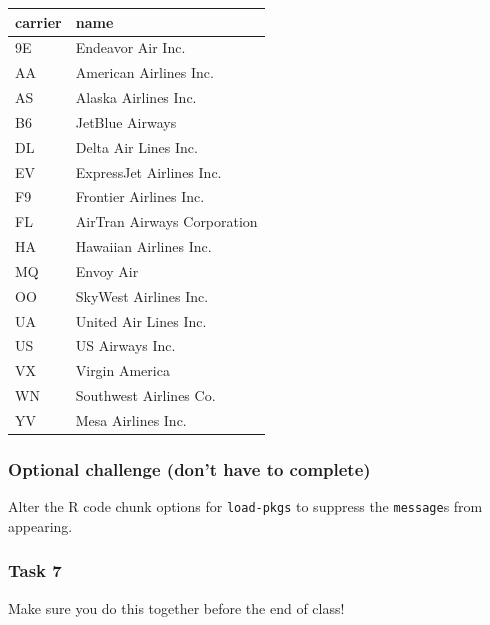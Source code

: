 \documentclass[
  letterpaper,
  DIV=11,
  numbers=noendperiod]{scrreprt}
\begin{document}
\begin{longtable}[]{@{}ll@{}}
\toprule()
carrier & name \\
\midrule()
\endhead
9E & Endeavor Air Inc. \\
AA & American Airlines Inc. \\
AS & Alaska Airlines Inc. \\
B6 & JetBlue Airways \\
DL & Delta Air Lines Inc. \\
EV & ExpressJet Airlines Inc. \\
F9 & Frontier Airlines Inc. \\
FL & AirTran Airways Corporation \\
HA & Hawaiian Airlines Inc. \\
MQ & Envoy Air \\
OO & SkyWest Airlines Inc. \\
UA & United Air Lines Inc. \\
US & US Airways Inc. \\
VX & Virgin America \\
WN & Southwest Airlines Co. \\
YV & Mesa Airlines Inc. \\
\bottomrule()
\end{longtable}

\hypertarget{optional-challenge-dont-have-to-complete}{%
\subsubsection*{Optional challenge (don't have to
complete)}\label{optional-challenge-dont-have-to-complete}}

Alter the R code chunk options for \texttt{load-pkgs} to suppress the
\texttt{message}s from appearing.

\hypertarget{task-7}{%
\subsubsection*{Task 7}\label{task-7}}

\begin{tcolorbox}[enhanced jigsaw, toptitle=1mm, colback=white, arc=.35mm, rightrule=.15mm, titlerule=0mm, left=2mm, breakable, bottomtitle=1mm, bottomrule=.15mm, leftrule=.75mm, title={Teaching note:}, colframe=quarto-callout-important-color-frame, opacitybacktitle=0.6, toprule=.15mm, colbacktitle=quarto-callout-important-color!10!white, coltitle=black, opacityback=0]
Make sure you do this together before the end of class!
\end{tcolorbox}
\end{document}
